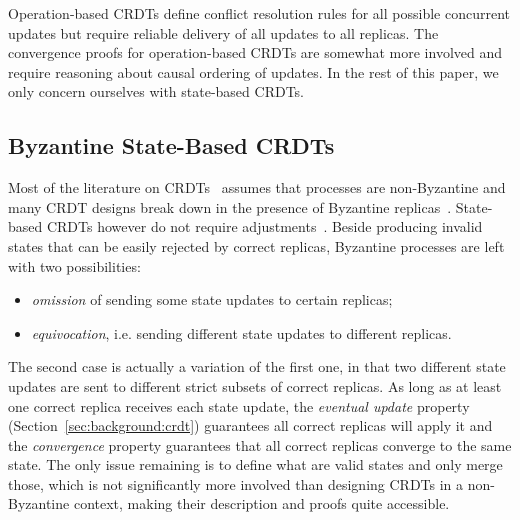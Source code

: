 \documentclass[9pt, oneside]{article}   	%
\begin{document}
Operation-based CRDTs define conflict resolution rules for all possible concurrent updates but require reliable delivery of all updates to all replicas. The convergence proofs for operation-based CRDTs are somewhat more involved and require reasoning about causal ordering of updates. In the rest of this paper, we only concern ourselves with state-based CRDTs.

\subsection{Byzantine State-Based CRDTs}
\label{sec:background:byzantine-state-crdt}

Most of the literature on CRDTs~\cite{crdt-website} assumes that processes are non-Byzantine and many CRDT designs break down in the presence of Byzantine replicas~\cite{Kleppmann2022byzantine}. State-based CRDTs however do not require adjustments~\cite{jacob2022bft-crdt}. Beside producing invalid states that can be easily rejected by correct replicas, Byzantine processes are left with two possibilities:
\begin{itemize}
	\item \textit{omission} of sending some state updates to certain replicas;
	\item \textit{equivocation}, i.e. sending different state updates to different replicas.
\end{itemize}

The second case is actually a variation of the first one, in that two different state updates are sent to different strict subsets of correct replicas. As long as at least one correct replica receives each state update, the \textit{eventual update} property (Section~\ref{sec:background:crdt}) guarantees all correct replicas will apply it and the \textit{convergence} property guarantees that all correct replicas converge to the same state. The only issue remaining is to define what are valid states and only merge those, which is not significantly more involved than designing CRDTs in a non-Byzantine context, making their description and proofs quite accessible.
\end{document}
